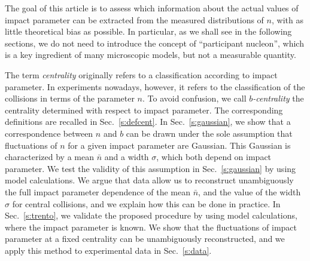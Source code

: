 \documentclass[aps,prc,twocolumn,superscriptaddress,showpacs,floatfix,nofootinbib]{revtex4-1}
\begin{document}
The goal of this article is to assess which information about the actual values of impact parameter can be extracted from the measured distributions of $n$, with as little theoretical bias as possible.
In particular, as we shall see in the following sections, we do not need to introduce the concept of ``participant nucleon'', which is a key ingredient of many microscopic models, but not a measurable quantity. 





The term \textit{centrality} originally refers to a classification
according to impact parameter. 
In experiments nowadays, however, it refers to the classification of the collisions in terms of the parameter $n$. 
To avoid confusion, we call \textit{$b$-centrality} the centrality determined with respect to impact parameter. 
The corresponding definitions are recalled in Sec.~\ref{s:defcent}.
In Sec.~\ref{s:gaussian}, we show that a correspondence between $n$ and $b$ can be drawn under the sole assumption that fluctuations of $n$ for a given impact parameter are Gaussian.
This Gaussian is characterized by a mean $\bar n$ and a width $\sigma$, which both depend on impact parameter.
We test the validity of this assumption in Sec.~\ref{s:gaussian} by using model calculations.
We argue that data allow us to reconstruct unambiguously the full impact parameter dependence of the mean $\bar n$, and the value of the width $\sigma$ for central collisions, and we explain how this can be done in practice. 
In Sec.~\ref{s:trento}, we validate the proposed procedure by using model calculations, where the impact parameter is known. 
We show that the fluctuations of impact parameter at a fixed  centrality can be unambiguously reconstructed, and we apply this method to experimental data in Sec.~\ref{s:data}. 
\end{document}
